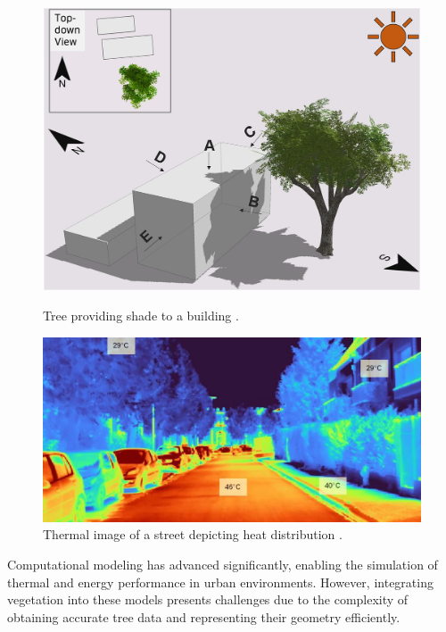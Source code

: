 \documentclass[12pt]{article}
\begin{document}
\begin{figure}[H]
    \centering
    \begin{minipage}{0.45\textwidth}
        \centering
        \includegraphics[width=\textwidth]{images/TreeShade.png}
        \caption{Tree providing shade to a building \cite{img:TreeShade}.}
    \end{minipage}\hfill
    \begin{minipage}{0.45\textwidth}
        \centering
        \includegraphics[width=\textwidth]{images/heat_street.png}
        \caption{Thermal image of a street depicting heat distribution \cite{img:street_thermography}.}
    \end{minipage}
\end{figure}

Computational modeling has advanced significantly, enabling the simulation of thermal 
and energy performance in urban environments. However, integrating vegetation into 
these models presents challenges due to the complexity of obtaining accurate tree data 
and representing their geometry efficiently\cite{AdTree}.
\end{document}
